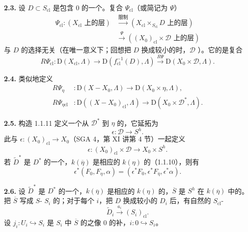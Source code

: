 \textbf{2.3.} 设 $D\subset S_{\mathrm{cl}}$ 是包含 $0$ 的一个。复合 $\Psi_{\mathrm{cl}}$（或简记为 $\Psi$）
\[
\begin{aligned}
 \Psi_{\mathrm{cl}}:(X_{\mathrm{cl}}\text{ 上的层})
 &\xrightarrow{\text{限制}}(X_{\mathrm{cl}}\times_{S_{\mathrm{cl}}}D\text{ 上的层})\\
 &\xrightarrow{\Psi}((X_0)_{\mathrm{cl}}\times\mathscr D\text{ 上的层})
\end{aligned}
\]
与 $D$ 的选择无关（在唯一意义下；回想把 $D$ 换成较小的时，$\mathscr D$ ）。它的是复合
\[
 R\Psi_{\mathrm{cl}}:\mathrm D(X_{\mathrm{cl}},\Lambda)
 \longrightarrow\mathrm D(f_{\mathrm{cl}}^{-1}(D),\Lambda)
 \xrightarrow{R\Psi}\mathrm D(X_0\times\mathscr D,\Lambda).
\]

\textbf{2.4.} 类似地定义
\[
\begin{aligned}
 R\Psi_\eta&:\mathrm D(X-X_0,\Lambda)\longrightarrow\mathrm D(X_0\times\eta,\Lambda),\\
 R\Psi_{\eta\mathrm{cl}}&:\mathrm D((X-X_0)_{\mathrm{cl}},\Lambda)
 \longrightarrow\mathrm D(X_0\times\mathscr D^*,\Lambda).
\end{aligned}
\]

\textbf{2.5.} 构造 1.1.11 定义一个从 $\mathscr D^*$ 到 $\eta$ 的，它延拓为
\[
 \epsilon:\mathscr D\longrightarrow S^h.
\]
此与 $\epsilon:(X_0)_{\mathrm{cl}}\to X_0$（SGA 4，第 XI 讲第 4 节）一起定义
\[
 \epsilon:(X_0)_{\mathrm{cl}}\times\mathscr D\longrightarrow X_0\times S^h.
\]
若 $\widetilde D^*$ 是 $D^*$ 的一个，$k(\overline\eta)$ 是相应的 $k(\eta)$ 的（1.1.10），则有
\[
 \epsilon^*(F_0,F_\eta,\alpha)
 =(\epsilon^*F_0,\epsilon^*F_{\overline\eta},\epsilon^*\alpha).
\]

\textbf{2.6.} 设 $\widetilde D^*$ 是 $D^*$ 的一个，$k(\overline\eta)$ 是相应的 $k(\eta)$ 的，$\overline S$ 是 $S^h$ 在 $k(\overline\eta)$ 中的。把 $\overline S$ 写成 $S$- $S_i$ 的；对于每个 $i$，把 $D$ 换成较小的 $D_i$ 后，有自然的 $S_{\mathrm{cl}}$-
\[
 \widetilde D_i\xrightarrow{a_i}(S_i)_{\mathrm{cl}}.
\]
设 $j_i:U_i\hookrightarrow S_i$ 是 $S_i$ 中 $\overline S$ 的之像 $0$ 的补，$i:0\hookrightarrow S_i$。

